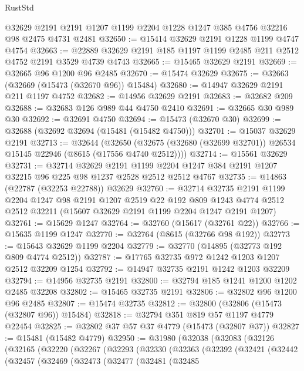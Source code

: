 \begin{lexlean}{RustStd}
\begin{coremodule}
    @32629
    @2191
    @2191
    @1207
    @1199
    @2204
    @1228
    @1247
    @385
    @4756
    @32216
    @98
    @2475
    @4731
    @2481
@32650 := @15414 @32629 @2191 @1228 @1199 @4747 @4754
@32663 := @22889 @32629 @2191 @185 @1197 @1199 @2485 @211 @2512 @4752 @2191 @3529 @4739 @4743
@32665 := @15465 @32629 @2191
@32669 := @32665 @96 @1200 @96 @2485
@32670 := @15474 @32629
@32675 := @32663 (@32669 (@15473 (@32670 @96)) @15484)
@32680 := @14947 @32629 @2191 @211 @1197 @4752
@32682 := @14956 @32629 @2191
@32683 := @32682 @209
@32688 := @32683 @126 @989 @44 @4750 @2410
@32691 := @32665 @30 @989 @30
@32692 := @32691 @4750
@32694 := @15473 (@32670 @30)
@32699 := @32688 (@32692 @32694 (@15481 (@15482 @4750)))
@32701 := @15037 @32629 @2191
@32713 := @32644
    (@32650 (@32675 (@32680 (@32699 @32701)) @26534 @15145 @22946 (@8615 (@17556 @4740 @2512))))
@32714 := @15561 @32629
@32731 := @32714
    @32629
    @2191
    @1199
    @2204
    @1247
    @384
    @2191
    @1207
    @32215
    @96
    @225
    @98
    @1237
    @2528
    @2512
    @2512
    @4767
@32735 := @14863 (@22787 (@32253 @22788)) @32629
@32760 := @32714
    @32735
    @2191
    @1199
    @2204
    @1247
    @98
    @2191
    @1207
    @2519
    @22
    @192
    @809
    @1243
    @4774
    @2512
    @2512
    @32211
    (@15607 @32629 @2191 @1199 @2204 @1247 @2191 @1207)
@32761 := @15629 @1247
@32764 := @32760 (@15617 (@32761 @22))
@32766 := @15635 @1199 @1247
@32770 := @32764 (@8615 (@32766 @98 @192))
@32773 := @15643 @32629 @1199 @2204
@32779 := @32770 (@14895 (@32773 @192 @809 @4774 @2512))
@32787 := @17765 @32735 @972 @1242 @1203 @1207 @2512 @32209 @1254
@32792 := @14947 @32735 @2191 @1242 @1203 @32209
@32794 := @14956 @32735 @2191
@32800 := @32794 @185 @1241 @1200 @1202 @2485 @32208
@32802 := @15465 @32735 @2191
@32806 := @32802 @96 @1200 @96 @2485
@32807 := @15474 @32735
@32812 := @32800 (@32806 (@15473 (@32807 @96)) @15484)
@32818 := @32794 @351 @819 @57 @1197 @4779 @22454
@32825 := @32802 @37 @57 @37 @4779 (@15473 (@32807 @37))
@32827 := @15481 (@15482 @4779)
@32950 := @31980
    (@32038
      (@32083
        (@32126
          (@32165
            (@32220
              (@32267
                (@32293
                  (@32330
                    (@32363
                      (@32392
                        (@32421
                          (@32442
                            (@32457
                              (@32469
                                (@32473
                                  (@32477
                                    (@32481
                                      (@32485

\end{coremodule}
\end{lexlean}
